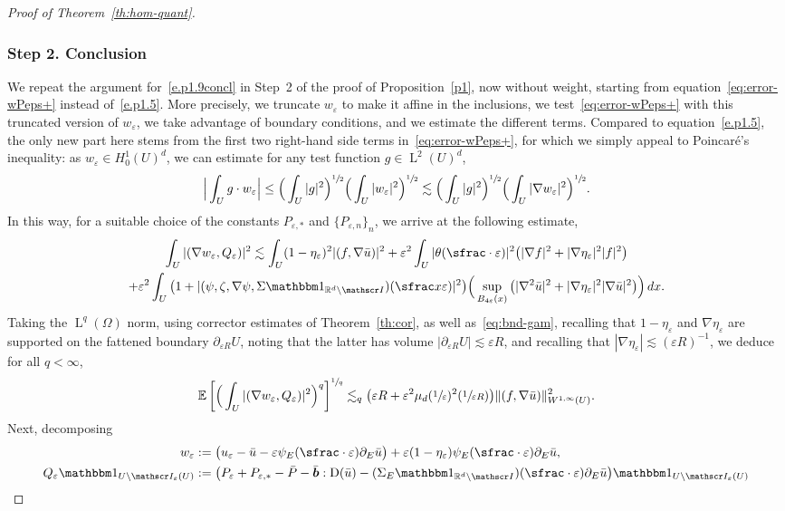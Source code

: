 \documentclass[10pt]{amsart}
\let\mathcal\mathscr
\newcommand{\Psfrac}[2]{(\sfrac{#1}{#2})}
\let\mathds\mathbbm
\theoremstyle{plain}
\theoremstyle{definition}
\newcommand{\e}{\varepsilon}
\newcommand{\R}{\mathbb R}
\newcommand{\Ic}{\mathcal I}
\newcommand{\D}{\operatorname{D}}
\newcommand{\bb}{\bar{\boldsymbol b}}
\newcommand{\Ld}{\operatorname{L}}
\newcommand{\step}[1]{\subsubsection*{Step #1}}
\newcommand{\expec}[1]{\mathbb{E}\left[ #1 \right]}
\begin{document}
\begin{proof}[Proof of Theorem~\ref{th:hom-quant}]
\step{2. Conclusion}
We repeat the argument for~\eqref{e.p1.9concl} in Step~2 of the proof of Proposition~\ref{p1}, now without weight, starting from equation~\eqref{eq:error-wPeps+} instead of~\eqref{e.p1.5}. More precisely, we truncate $w_\e$ to make it affine in the inclusions, we test~\eqref{eq:error-wPeps+} with this truncated version of $w_\e$, we take advantage of boundary conditions, and we estimate the different terms.
Compared to equation~\eqref{e.p1.5}, the only new part here stems from the first two right-hand side terms in~\eqref{eq:error-wPeps+}, for which we simply appeal to Poincaré's inequality: as $w_\e\in H^1_0(U)^d$, we can estimate for any test function $g\in \Ld^2(U)^d$,
\[\Big|\int_Ug\cdot w_\e\Big|\le \Big(\int_U|g|^2\Big)^{\sfrac12}\Big(\int_U|w_\e|^2\Big)^{\sfrac12}\lesssim \Big(\int_U|g|^2\Big)^{\sfrac12}\Big(\int_U|\nabla w_\e|^2\Big)^{\sfrac12}.\]
In this way, for a suitable choice of the constants $P_{\e,*}$ and $\{P_{\e,n}\}_n$, we arrive at the following estimate,
\begin{multline}\label{eq:bnd-weps-Qeps-pre}
\int_{U}|(\nabla w_\e,Q_\e)|^2
\lesssim \int_{U}(1-\eta_\e)^2|(f,\nabla\bar u)|^2
+\e^2\int_U|\theta(\sfrac\cdot\e)|^2\big(|\nabla f|^2+|\nabla\eta_\e|^2|f|^2\big)\\
+\e^2\int_U\big(1+|(\psi,\zeta,\nabla\psi,\Sigma\mathds1_{\R^d\setminus\Ic})(\sfrac x\e)|^2\big)\Big(\sup_{B_{4\e}(x)}\big(|\nabla^2\bar u|^2+|\nabla\eta_\e|^2|\nabla\bar u|^2\big)\Big)\,dx.
\end{multline}
Taking the $\Ld^q(\Omega)$ norm, using corrector estimates of Theorem~\ref{th:cor}, as well as~\eqref{eq:bnd-gam},
recalling that $1-\eta_\e$ and $\nabla\eta_\e$ are supported on the fattened boundary $\partial_{\e R}U$, noting that the latter has volume $|\partial_{\e R}U|\lesssim \e R$, and recalling that \mbox{$|\nabla\eta_\e|\lesssim(\e R)^{-1}$},
we deduce for all $q<\infty$,
\begin{equation}\label{eq:bnd-weps-Qeps-pre-re}
\expec{\Big(\int_{U}|(\nabla w_\e,Q_\e)|^2\Big)^q}^{\sfrac1q}
\lesssim_q 
\big(\e R+\e^2 \mu_d(\sfrac1\e)^2\Psfrac1{\e R}\big)\|(f,\nabla\bar u)\|_{W^{1,\infty}(U)}^2.
\end{equation}
Next, decomposing
\begin{align*}
w_\e&:= \big(u_\e-\bar u-\e\psi_E(\sfrac\cdot\e)\partial_E\bar u\big)+\e(1-\eta_\e)\psi_E(\sfrac\cdot\e)\partial_E\bar u,\\
Q_\e\mathds1_{U\setminus\Ic_\e(U)}&:= \big(P_\e+P_{\e,*}-\bar P-\bb:\D(\bar u)-(\Sigma_E\mathds1_{\R^d\setminus\Ic})(\sfrac\cdot\e)\partial_E\bar u\big)\mathds1_{U\setminus\Ic_\e(U)}\\

\end{align*}
\end{proof}
\end{document}

